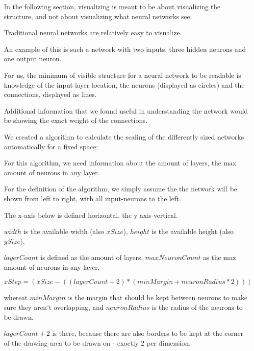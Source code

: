 In the following section, visualizing is meant to be about visualizing the structure, and not about visualizing what neural networks see.\cite{deepnetworkvisualizing2015}

Traditional neural networks are relatively easy to visualize.

An example of this is such a network with two inputs, three hidden neurons and one output neuron.

{\centering
	\begin{neuralnetwork}[height=3, nodespacing=1.5cm]
		\newcommand{\nodelabel}[2]{
			\ifnum#1=0 $x_#2$ \fi
			\ifnum#1=1 $y_#2$ \fi
			\ifnum#1=2 $z_#2$ \fi
		}
		\setdefaultnodetext{\nodelabel}
		\hiddenlayer[count=3, bias=false, title=] \linklayers
		\outputlayer[count=1, title=] \linklayers
	\end{neuralnetwork}
	\par}

For us, the minimum of visible structure for a neural network to be readable is knowledge of the input layer location, the neurons (displayed as circles) and the connections, displayed as lines.

Additional information that we found useful in understanding the network would be showing the exact weight of the connections.

We created a algorithm to calculate the scaling of the differently sized networks automatically for a fixed space:

For this algorithm, we need information about the amount of layers, the max amount of neurons in any layer.

For the definition of the algorithm, we simply assume the the network will be shown from left to right, with all input-neurons to the left.

The x-axis below is defined horizontal, the y axis vertical.

$ width $ is the available width (also $ xSize $), $ height $ is the available height (also $ ySize $).

$ layerCount $ is defined as the amount of layers, $ maxNeuronCount $ as the max amount of neurons in any layer.



$$ xStep = (xSize - ((layerCount + 2) * (minMargin + neuronRadius * 2))) $$

 whereat $ minMargin $ is the margin that should be kept between neurons to make sure they aren't overlapping, and $ neuronRadius $ is the radius of the neurons to be drawn.
 
 $ layerCount + 2 $ is there, because there are also borders to be kept at the corner of the drawing area to be drawn on - exactly 2 per dimension.